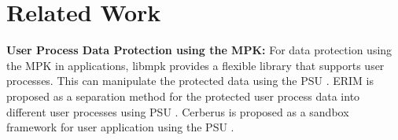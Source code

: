 \section{Related Work}  \label{section:related_works}


{\bf User Process Data Protection using the MPK:}
For data protection using the MPK in applications, libmpk provides a flexible
library that supports user processes. This can manipulate the protected data
using the PSU \cite{libmpk}.
ERIM is proposed as a separation method for the protected user process data into
different user processes using PSU \cite{erim}.
%
Cerberus is proposed as a sandbox framework for user application using the PSU
\cite{Voulimeneas22eurosys}.

